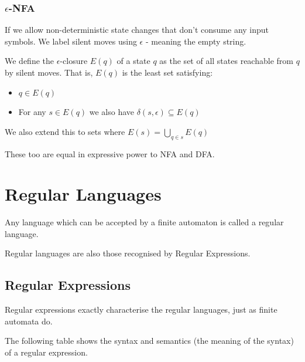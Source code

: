 \documentclass{article}
\begin{document}
\subsubsection{$\epsilon$-NFA}\label{epsilon-transitions}
If we allow non-deterministic state changes that don't consume any input symbols. We label silent moves using $\epsilon$ - meaning the empty string.

We define the $\epsilon$-closure $E(q)$ of a state $q$ as the set of all states reachable from $q$ by silent moves. That is, $E(q)$ is the least set satisfying:
 \begin{itemize}
     \item $q \in E(q)$
     \item For any $s \in E(q)$ we also have $\delta(s, \epsilon) \subseteq E(q)$
 \end{itemize}

 We also extend this to sets where $E(s) = \bigcup\limits_{q \in s}{E(q)}$

 These too are equal in expressive power to NFA and DFA.

\newpage

\section{Regular Languages}\label{regular-languages}
Any language which can be accepted by a finite automaton is called a regular language.

Regular languages are also those recognised by Regular Expressions.

\subsection{Regular Expressions}\label{regex}
Regular expressions exactly characterise the regular languages, just as finite automata do.

The following table shows the syntax and semantics (the meaning of the syntax) of a regular expression.
\end{document}
